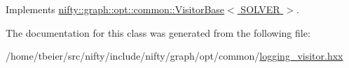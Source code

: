 Implements \hyperlink{classnifty_1_1graph_1_1opt_1_1common_1_1VisitorBase_aaeef625f11705918d3fdd05f2550a879}{nifty\+::graph\+::opt\+::common\+::\+Visitor\+Base$<$ S\+O\+L\+V\+E\+R $>$}.



The documentation for this class was generated from the following file\+:\begin{DoxyCompactItemize}
\item 
/home/tbeier/src/nifty/include/nifty/graph/opt/common/\hyperlink{logging__visitor_8hxx}{logging\+\_\+visitor.\+hxx}\end{DoxyCompactItemize}
